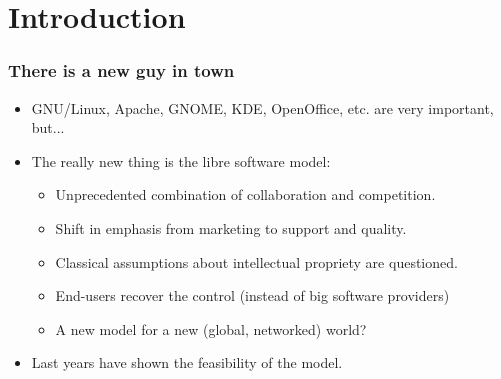 

\section{Introduction}

\begin{frame}
\frametitle{There is a new guy in town}

\begin{itemize}
\item GNU/Linux, Apache, GNOME, KDE, OpenOffice, etc. are very
  important, but...
\item The really new thing is the libre software model:
  \begin{itemize}
  \item Unprecedented combination of collaboration and competition.
  \item Shift in emphasis from marketing to support and quality.
  \item Classical assumptions about intellectual propriety are
    questioned.
  \item End-users recover the control (instead of big software providers)
  \item A new model for a new (global, networked) world?
  \end{itemize}
\item Last years have shown the feasibility of the model.
\end{itemize}

\end{frame}




